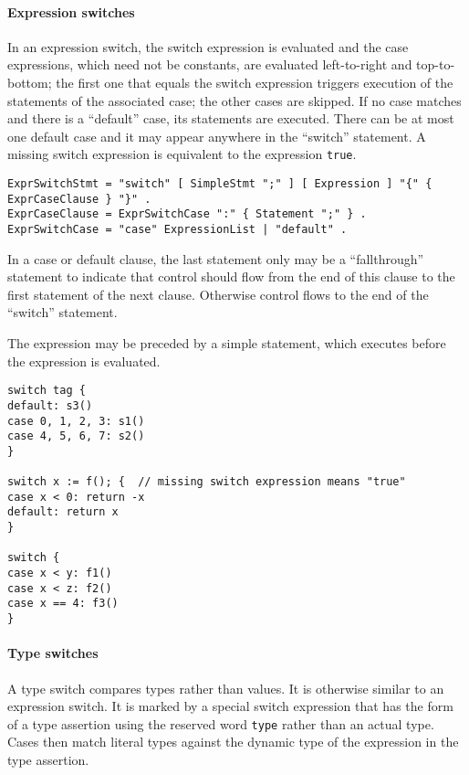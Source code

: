 \paragraph{Expression switches}

In an expression switch, the switch expression is evaluated and the case
expressions, which need not be constants, are evaluated left-to-right
and top-to-bottom; the first one that equals the switch expression
triggers execution of the statements of the associated case; the other
cases are skipped. If no case matches and there is a ``default'' case,
its statements are executed. There can be at most one default case and
it may appear anywhere in the ``switch'' statement. A missing switch
expression is equivalent to the expression \texttt{true}.

\begin{Verbatim}[frame=single]
ExprSwitchStmt = "switch" [ SimpleStmt ";" ] [ Expression ] "{" { ExprCaseClause } "}" .
ExprCaseClause = ExprSwitchCase ":" { Statement ";" } .
ExprSwitchCase = "case" ExpressionList | "default" .
\end{Verbatim}

In a case or default clause, the last statement only may be a
``fallthrough'' statement to indicate that control should flow from
the end of this clause to the first statement of the next clause.
Otherwise control flows to the end of the ``switch'' statement.

The expression may be preceded by a simple statement, which executes
before the expression is evaluated.

\begin{Verbatim}[frame=single]
switch tag {
default: s3()
case 0, 1, 2, 3: s1()
case 4, 5, 6, 7: s2()
}

switch x := f(); {  // missing switch expression means "true"
case x < 0: return -x
default: return x
}

switch {
case x < y: f1()
case x < z: f2()
case x == 4: f3()
}
\end{Verbatim}

\paragraph{Type switches}

A type switch compares types rather than values. It is otherwise similar
to an expression switch. It is marked by a special switch expression
that has the form of a type assertion using
the reserved word \texttt{type} rather than an actual type. Cases then
match literal types against the dynamic type of the expression in the
type assertion.

